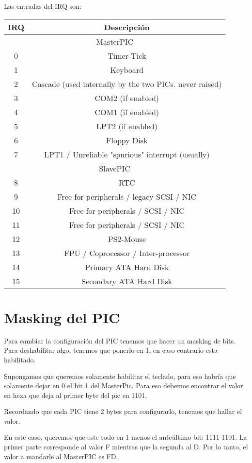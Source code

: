 \documentclass[]{article}
\begin{document}
Las entradas del IRQ son:
\begin{center}
	\begin{tabular}{ |c|c| }
		\hline
		IRQ & Descripción\\
		\hline
		\multicolumn{2}{|c|}{MasterPIC} \\	
		\hline	
		0 & Timer-Tick\\
		1 & Keyboard \\
		2 & Cascade (used internally by the two PICs. never raised) \\
		3 & COM2 (if enabled)  \\
		4 & COM1 (if enabled)  \\
		5 & LPT2 (if enabled)  \\
		6 & Floppy Disk  \\
		7 & LPT1 / Unreliable "spurious" interrupt (usually)  \\
		\hline
		\multicolumn{2}{|c|}{SlavePIC} \\	
		\hline	
		8 & RTC \\
		9 & Free for peripherals / legacy SCSI / NIC  \\
		10 & Free for peripherals / SCSI / NIC  \\
		11 & Free for peripherals / SCSI / NIC  \\
		12 & PS2-Mouse \\
		13 & FPU / Coprocessor / Inter-processor  \\
		14 & Primary ATA Hard Disk  \\
		15 & Secondary ATA Hard Disk  \\
		\hline
	\end{tabular}
\end{center}

\section*{Masking del PIC}
Para cambiar la configuración del PIC tenemos que hacer un masking de bits.
Para deshabilitar algo, tenemos que ponerlo en 1, en caso contrario esta habilitado.

Supongamos que queremos solamente habilitar el teclado, para eso habría que
solamente dejar en 0 el bit 1 del MasterPic. Para eso debemos encontrar el valor
en hexa que deja al primer byte del pic en 1101.

Recordando que cada PIC tiene 2 bytes para configurarlo, tenemos que hallar el valor.

En este caso, queremos que este todo en 1 menos el anteúltimo bit: 1111-1101.
La primer parte corresponde al valor F mientras que la segunda al D. Por lo tanto,
el valor a mandarle al MasterPIC es FD.
\end{document}
